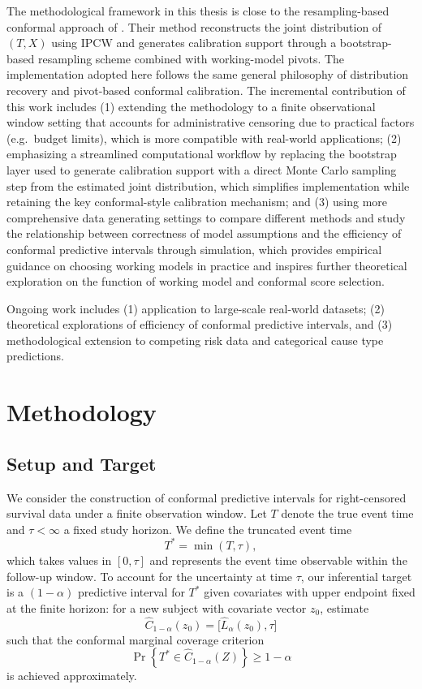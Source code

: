 \documentclass[12pt]{article}
\makeatletter
\let\thesis@chapter\section
\let\thesis@section\subsection
\let\thesis@subsection\subsubsection
\newcommand{\chapter}{\thesis@chapter}
\renewcommand{\section}{\thesis@section}
\renewcommand{\subsection}{\thesis@subsection}
\makeatother
\begin{document}
The methodological framework in this thesis is close to the resampling-based conformal approach of \citet{qin2025conformal}. Their method reconstructs the joint distribution of $(T,X)$ using IPCW and generates calibration support through a bootstrap-based resampling scheme combined with working-model pivots. The implementation adopted here follows the same general philosophy of distribution recovery and pivot-based conformal calibration. The incremental contribution of this work includes (1) extending the methodology to a finite observational window setting that accounts for administrative censoring due to practical factors (e.g.\ budget limits), which is more compatible with real-world applications; (2) emphasizing a streamlined computational workflow by replacing the bootstrap layer used to generate calibration support with a direct Monte Carlo sampling step from the estimated joint distribution, which simplifies implementation while retaining the key conformal-style calibration mechanism; and (3) using more comprehensive data generating settings to compare different methods and study the relationship between correctness of model assumptions and the efficiency of conformal predictive intervals through simulation, which provides empirical guidance on choosing working models in practice and inspires further theoretical exploration on the function of working model and conformal score selection.

Ongoing work includes (1) application to large-scale real-world datasets; (2) theoretical explorations of efficiency of conformal predictive intervals, and (3) methodological extension to competing risk data and categorical cause type predictions.



\chapter{Methodology}

\section{Setup and Target}
We consider the construction of conformal predictive intervals for right-censored
survival data under a finite observation window.
Let $T$ denote the true event time and $\tau<\infty$ a fixed study horizon.
We define the truncated event time
\[
T^* = \min(T,\tau),
\]
which takes values in $[0,\tau]$ and represents the event time observable within
the follow-up window.
To account for the uncertainty at time $\tau$, our inferential target is a $(1-\alpha)$ predictive interval for $T^*$ given covariates with upper endpoint fixed at the finite horizon: for a new subject with covariate vector $z_0$, estimate
\[
{\widehat C_{1-\alpha}(z_0)=\big[\widehat L_\alpha(z_0),\tau\big]}
\]
such that the conformal marginal coverage criterion
\[
\Pr\!\left\{T^* \in \widehat C_{1-\alpha}(Z)\right\}\ge 1-\alpha
\]
is achieved approximately.
\end{document}
